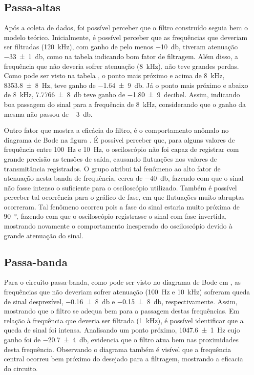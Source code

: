 \subsection{Passa-altas}

  Após a coleta de dados, foi possível perceber que o filtro construído seguia bem o modelo teórico. Inicialmente, é possível perceber que as frequências que deveriam ser filtradas (\SI{120}{\kilo\hertz}), com ganho de pelo menos \SI{-10}{\decibel}, tiveram atenuação \SI{-33(1)}{\decibel}, como na tabela  indicando bom fator de filtragem. Além disso, a frequência que não deveria sofrer atenuação (\SI{8}{\kilo\hertz}), não teve grandes perdas. Como pode ser visto na tabela , o ponto mais próximo e acima de \SI{8}{\kilo\hertz}, \SI{8353,8(8)}{\hertz}, teve ganho de \SI{-1,64(9)}{\decibel}. Já o ponto mais próximo e abaixo de \SI{8}{\kilo\hertz}, \SI{7,7766(8)}{\decibel} teve ganho de \SI{-1,80(9)}{decibel}. Assim, indicando boa passagem do sinal para a frequência de \SI{8}{\kilo\hertz}, considerando que o ganho da mesma não passou de \SI{-3}{\decibel}.

  Outro fator que mostra a eficácia do filtro, é o comportamento anômalo no diagrama de Bode na figura . É possível perceber que, para alguns valores de frequência entre \SI{100}{\hertz} e \SI{10}{\hertz}, o osciloscópio não foi capaz de registrar com grande precisão as tensões de saída, causando flutuações nos valores de transmitância registrados. O grupo atribui tal fenômeno ao alto fator de atenuação nesta banda de frequência, cerca de \SI{-40}{\decibel}, fazendo com que o sinal não fosse intenso o suficiente para o osciloscópio utilizado. Também é possível perceber tal ocorrência para o gráfico de fase, em que flutuações muito abruptas ocorreram. Tal fenômeno ocorreu pois a fase do sinal estaria muito próxima de \SI{90}{\degree}, fazendo com que o osciloscópio registrasse o sinal com fase invertida, mostrando novamente o comportamento inesperado do osciloscópio devido à grande atenuação do sinal.

\subsection{Passa-banda}

  Para o circuito passa-banda, como pode ser visto no diagrama de Bode em , as frequências que não deveriam sofrer  atenuação (\SI{100}{\hertz} e \SI{10}{\kilo\hertz}) sofreram queda de sinal desprezível, \SI[scientific-notation=false]{-0,16(8)}{\decibel} e \SI[scientific-notation=false]{-0,15(8)}{\decibel}, respectivamente. Assim, mostrando que o filtro se adequa bem para a passagem destas frequências. Em relação à frequência que deveria ser filtrada (\SI{1}{\kilo\hertz}), é possível identificar que a queda de sinal foi intensa. Analisando um ponto próximo, \SI{1047,6(1)}{\hertz} cujo ganho foi de \SI{-20,7(4)}{\decibel}, evidencia que o filtro atua bem nas proximidades desta frequência. Observando o diagrama  também é visível que a frequência central ocorreu bem próximo do desejado para a filtragem, mostrando a eficacia do circuito.


